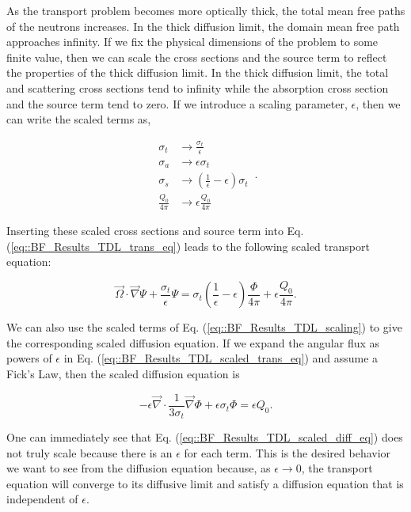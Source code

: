 \noindent As the transport problem becomes more optically thick, the total mean free paths of the neutrons increases. In the thick diffusion limit, the domain mean free path approaches infinity. If we fix the physical dimensions of the problem to some finite value, then we can scale the cross sections and the source term to reflect the properties of the thick diffusion limit. In the thick diffusion limit, the total and scattering cross sections tend to infinity while the absorption cross section and the source term tend to zero. If we introduce a scaling parameter, $\epsilon$, then we can write the scaled terms as,

\begin{equation}
\label{eq::BF_Results_TDL_scaling}
\begin{aligned}
	\sigma_t &\rightarrow \frac{\sigma_t}{\epsilon} \\
	\sigma_a &\rightarrow \epsilon \sigma_t\\
	\sigma_s &\rightarrow \left( \frac{1}{\epsilon} - \epsilon   \right) \sigma_t \\
	\frac{Q_0}{4 \pi} &\rightarrow \epsilon \frac{Q_0}{4 \pi}
\end{aligned} \, .
\end{equation}

\noindent Inserting these scaled cross sections and source term into Eq. (\ref{eq::BF_Results_TDL_trans_eq}) leads to the following scaled transport equation:

\begin{equation}
\label{eq::BF_Results_TDL_scaled_trans_eq}
\vec{\Omega} \cdot \vec{\nabla} \Psi + \frac{\sigma_t}{\epsilon} \Psi = \sigma_t \left( \frac{1}{\epsilon} - \epsilon   \right)  \frac{\Phi}{4 \pi} + \epsilon \frac{Q_0}{4 \pi} .
\end{equation}

\noindent We can also use the scaled terms of Eq. (\ref{eq::BF_Results_TDL_scaling}) to give the corresponding scaled diffusion equation. If we expand the angular flux as powers of $\epsilon$ in Eq. (\ref{eq::BF_Results_TDL_scaled_trans_eq}) and assume a Fick's Law, then the scaled diffusion equation is

\begin{equation}
\label{eq::BF_Results_TDL_scaled_diff_eq}
-\epsilon \vec{\nabla} \cdot \frac{1}{3 \sigma_t}  \vec{\nabla} \Phi + \epsilon \sigma_t \Phi =  \epsilon Q_0.
\end{equation}

\noindent One can immediately see that Eq. (\ref{eq::BF_Results_TDL_scaled_diff_eq}) does not truly scale because there is an $\epsilon$ for each term. This is the desired behavior we want to see from the diffusion equation because, as $\epsilon \rightarrow 0$, the transport equation will converge to its diffusive limit and satisfy a diffusion equation that is independent of $\epsilon$.

